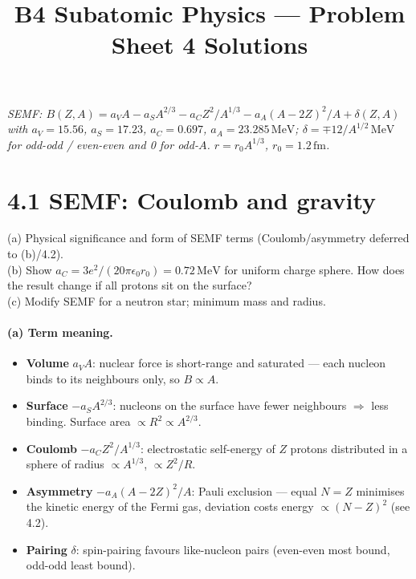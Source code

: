 \documentclass[11pt]{article}
\title{B4 Subatomic Physics --- Problem Sheet 4 Solutions}
\author{}
\date{}
\newcommand{\Q}[1]{\begin{question}#1\end{question}}
\newcommand{\fm}{\,\mathrm{fm}}
\newcommand{\MeV}{\,\mathrm{MeV}}
\begin{document}
\maketitle

\noindent\textit{SEMF: $B(Z,A)=a_V A-a_S A^{2/3}-a_C Z^{2}/A^{1/3}-a_A(A-2Z)^{2}/A+\delta(Z,A)$ with $a_V=15.56$, $a_S=17.23$, $a_C=0.697$, $a_A=23.285\MeV$; $\delta=\mp 12/A^{1/2}\MeV$ for odd-odd / even-even and 0 for odd-$A$. $r=r_0 A^{1/3}$, $r_0=1.2\fm$.}

\section*{4.1 \quad SEMF: Coulomb and gravity}

\Q{(a) Physical significance and form of SEMF terms (Coulomb/asymmetry deferred to (b)/4.2).\\
(b) Show $a_C=3e^{2}/(20\pi\epsilon_{0}r_0)=0.72\MeV$ for uniform charge sphere. How does the result change if all protons sit on the surface?\\
(c) Modify SEMF for a neutron star; minimum mass and radius.}

\paragraph{(a) Term meaning.}
\begin{itemize}[itemsep=2pt]
\item \textbf{Volume} $a_V A$: nuclear force is short-range and saturated --- each nucleon binds to its neighbours only, so $B\propto A$.
\item \textbf{Surface} $-a_S A^{2/3}$: nucleons on the surface have fewer neighbours $\Rightarrow$ less binding. Surface area $\propto R^{2}\propto A^{2/3}$.
\item \textbf{Coulomb} $-a_C Z^{2}/A^{1/3}$: electrostatic self-energy of $Z$ protons distributed in a sphere of radius $\propto A^{1/3}$, $\propto Z^{2}/R$.
\item \textbf{Asymmetry} $-a_A(A-2Z)^{2}/A$: Pauli exclusion --- equal $N=Z$ minimises the kinetic energy of the Fermi gas, deviation costs energy $\propto(N-Z)^{2}$ (see 4.2).
\item \textbf{Pairing} $\delta$: spin-pairing favours like-nucleon pairs (even-even most bound, odd-odd least bound).
\end{itemize}
\end{document}

